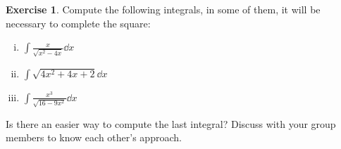 \documentclass[12pt]{article}
\theoremstyle{plain}
\theoremstyle{definition}
\newtheorem{Ej}[Th]{Exercise}         %
\theoremstyle{remark}
\renewcommand{\:}{\colon}           %
\renewcommand{\.}{\Cdot}                %
\begin{document}
\begin{multicols}{2}
\begin{Ej}
Compute the following integrals, in some of them, it will be necessary to complete the square:
\vspace*{-0.4em}
\begin{enumerate}[i)]
  \itemsep=-0.2em
  \item $\displaystyle\int\frac{x}{\sqrt{x^2-4x}}\dd x$
  \item $\displaystyle\int\sqrt{4x^2+4x+2}\dd x$
  \item $\displaystyle\int\frac{x^3}{\sqrt{16-9x^2}}\dd x$
\end{enumerate}
Is there an easier way to compute the last integral? Discuss with your group members to know each other's approach.
\end{Ej}
\vfill\null
\end{multicols}
\end{document}
